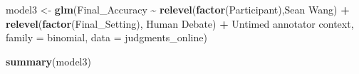 \documentclass[
]{article}
\newenvironment{Shaded}{\begin{snugshade}}{\end{snugshade}}
\newcommand{\AttributeTok}[1]{\textcolor[rgb]{0.13,0.29,0.53}{#1}}
\newcommand{\FunctionTok}[1]{\textcolor[rgb]{0.13,0.29,0.53}{\textbf{#1}}}
\newcommand{\NormalTok}[1]{#1}
\newcommand{\OtherTok}[1]{\textcolor[rgb]{0.56,0.35,0.01}{#1}}
\newcommand{\SpecialCharTok}[1]{\textcolor[rgb]{0.81,0.36,0.00}{\textbf{#1}}}
\newcommand{\StringTok}[1]{\textcolor[rgb]{0.31,0.60,0.02}{#1}}
\begin{document}
\begin{Shaded}
\begin{Highlighting}[]
\NormalTok{model3 }\OtherTok{\textless{}{-}} \FunctionTok{glm}\NormalTok{(Final\_Accuracy }\SpecialCharTok{\textasciitilde{}} \FunctionTok{relevel}\NormalTok{(}\FunctionTok{factor}\NormalTok{(Participant),}\StringTok{\textquotesingle{}Sean Wang\textquotesingle{}}\NormalTok{) }\SpecialCharTok{+} \FunctionTok{relevel}\NormalTok{(}\FunctionTok{factor}\NormalTok{(Final\_Setting), }\StringTok{\textquotesingle{}Human Debate\textquotesingle{}}\NormalTok{) }\SpecialCharTok{+} \StringTok{\textasciigrave{}}\AttributeTok{Untimed annotator context}\StringTok{\textasciigrave{}}\NormalTok{, }\AttributeTok{family =} \StringTok{\textquotesingle{}binomial\textquotesingle{}}\NormalTok{, }\AttributeTok{data =}\NormalTok{ judgments\_online)}

\FunctionTok{summary}\NormalTok{(model3)}
\end{Highlighting}
\end{Shaded}
\end{document}
